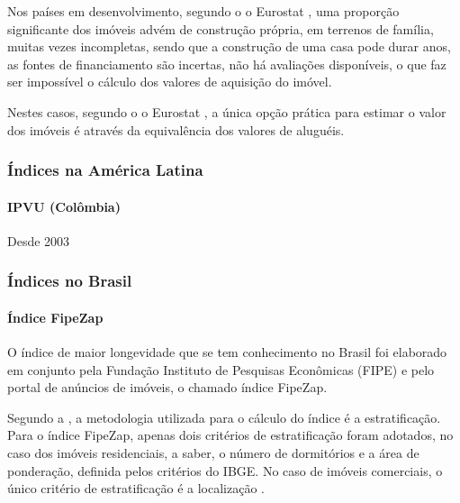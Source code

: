 \documentclass[
	12pt,				%
	oneside,			%
	a4paper,			%
	chapter=TITLE,		%
	section=TITLE,		%
	english,			%
	brazil				%
	]{abntex2}
\begin{document}
Nos países em desenvolvimento, segundo o o Eurostat \autocite*[110]{rppi}, uma proporção
significante dos imóveis advém de construção própria, em terrenos de família,
muitas vezes incompletas, sendo que a construção de uma casa pode durar anos, as
fontes de financiamento são incertas, não há avaliações disponíveis, o que faz
ser impossível o cálculo dos valores de aquisição do imóvel.

Nestes casos, segundo o o Eurostat \autocite*[110]{rppi}, a única opção prática para
estimar o valor dos imóveis é através da equivalência dos valores de aluguéis.

\hypertarget{uxedndices-na-amuxe9rica-latina}{%
\subsubsection{Índices na América Latina}\label{uxedndices-na-amuxe9rica-latina}}

\hypertarget{ipvu-coluxf4mbia}{%
\paragraph{IPVU (Colômbia)}\label{ipvu-coluxf4mbia}}

Desde 2003 \autocite[130]{rppi}

\hypertarget{uxedndices-no-brasil}{%
\subsubsection{Índices no Brasil}\label{uxedndices-no-brasil}}

\hypertarget{uxedndice-fipezap}{%
\paragraph{Índice FipeZap}\label{uxedndice-fipezap}}

O índice de maior longevidade que se tem conhecimento no Brasil foi elaborado em
conjunto pela Fundação Instituto de Pesquisas Econômicas (FIPE) e pelo portal de
anúncios de imóveis, o chamado índice FipeZap.

Segundo a \textcite{fipezap}, a metodologia utilizada para o cálculo do índice é a
estratificação. Para o índice FipeZap, apenas dois critérios de estratificação
foram adotados, no caso dos imóveis residenciais, a saber, o número de
dormitórios e a área de ponderação, definida pelos critérios do IBGE. No caso de
imóveis comerciais, o único critério de estratificação é a localização
\autocite[7]{fipezap}.
\end{document}
